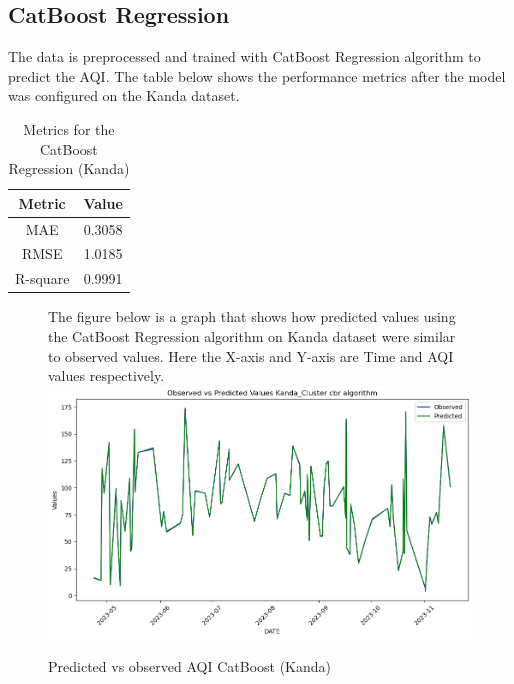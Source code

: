 \documentclass{book}
\numberwithin{equation}{section}
\numberwithin{figure}{section}
\begin{document}
\subsection{CatBoost Regression}
The data is preprocessed and trained with CatBoost Regression algorithm to predict the AQI. The table below shows the performance metrics after the model was configured on the Kanda dataset.\\
\begin{table}[H]
    \centering
    \begin{tabular}{|c|c|}
        \hline
        \textbf{Metric} & \textbf{Value} \\
        \hline
        MAE & 0.3058 \\
        \hline
        RMSE & 1.0185 \\
        \hline
        R-square & 0.9991\\
        \hline
    \end{tabular}
    \caption{Metrics for the CatBoost Regression (Kanda)}
    \label{tab: CBR metrics(Kanda)}
\end{table}
\begin{figure}[H]
 \begin{minipage}{\linewidth}
        The figure below is a graph that shows how predicted values using the CatBoost Regression algorithm on Kanda dataset were similar to observed values. Here the X-axis and Y-axis are Time and AQI values respectively.
        \vspace{0.5em} 
        \includegraphics[width=\linewidth]{kanda cbr.png}
       
        \caption{ Predicted vs observed AQI CatBoost (Kanda)}
        \label{fig: CBR predicted vs observed AQI(Kanda)}
    \end{minipage}
\end{figure}
\end{document}

